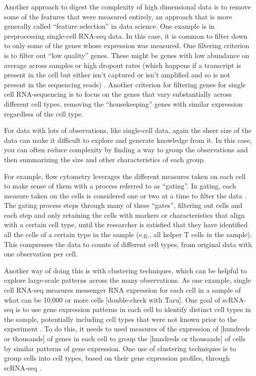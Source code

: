 \documentclass[]{tufte-book}
\begin{document}
Another approach to digest the complexity of high dimensional data is to remove
some of the features that were measured entirely, an approach that is more
generally called ``feature selection'' in data science. One example is in
preprocessing single-cell RNA-seq data. In this case, it is common to filter
down to only some of the genes whose expression was measured. One filtering
criterion is to filter out ``low quality'' genes. These might be genes with low
abundance on average across samples or high dropout rates (which happens if
a transcript is present in the cell but either isn't captured or isn't amplified
and so is not present in the sequencing reads) \citep[
\citet{mccarthy2017scater}]{haque2017practical}. Another criterion for filtering genes for single cell
RNA-sequencing is to focus on the genes that vary substantially across different
cell types, removing the ``housekeeping'' genes with similar expression regardless
of the cell type.

For data with lots of observations, like single-cell data, again the sheer size
of the data can make it difficult to explore and generate knowledge from it. In
this case, you can often reduce complexity by finding a way to group the
observations and then summarizing the size and other characteristics of each
group.

For example, flow cytometry leverages the different measures taken on each cell
to make sense of them with a process referred to as ``gating''. In gating, each
measure taken on the cells is considered one or two at a time to filter the data
\citep{maecker2012standardizing}. The gating process steps through many of these
``gates'', filtering out cells and each step and only retaining the cells with
markers or characteristics that align with a certain cell type, until the
researcher is satisfied that they have identified all the cells of a certain
type in the sample (e.g., all helper T cells in the sample).
This compresses the data to counts of different cell types, from original
data with one observation per cell.

Another way of doing this is with clustering techniques, which can be helpful to
explore large-scale patterns across the many observations. As one example,
single cell RNA-seq measures messenger RNA expression for each cell in a sample
of what can be 10,000 or more cells {[}double-check with Taru{]}. One goal of
scRNA-seq is to use gene expression patterns in each cell to identify distinct
cell types in the sample, potentially including cell types that were not known
prior to the experiment \citep{perkel2017single}. To do this, it needs to used
measures of the expression of {[}hundreds or thousands{]} of genes in each cell to
group the {[}hundreds or thousands{]} of cells by similar patterns of gene
expression. One use of clustering techniques is to group cells into cell types,
based on their gene expression profiles, through scRNA-seq
\citep{haque2017practical}.
\end{document}
